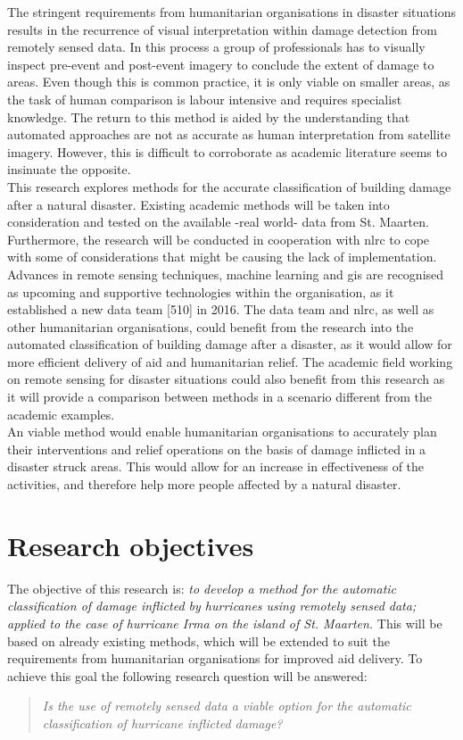 \noindent The stringent requirements from humanitarian organisations in disaster situations results in the recurrence of visual interpretation within damage detection from remotely sensed data. In this process a group of professionals has to visually inspect pre-event and post-event imagery to conclude the extent of damage to areas. Even though this is common practice, it is only viable on smaller areas, as the task of human comparison is labour intensive and requires specialist knowledge. The return to this method is aided by the understanding that automated approaches are not as accurate as human interpretation from satellite imagery. However, this is difficult to corroborate as academic literature seems to insinuate the opposite. \\

\noindent This research explores methods for the accurate classification of building damage after a natural disaster. Existing academic methods will be taken into consideration and tested on the available -real world- data from St. Maarten. Furthermore, the research will be conducted in cooperation with \ac{nlrc} to cope with some of considerations that might be causing the lack of implementation. Advances in remote sensing techniques, machine learning and \ac{gis} are recognised as upcoming and supportive technologies within the organisation, as it established a new data team [510] in 2016. The data team and \ac{nlrc}, as well as other humanitarian organisations, could benefit from the research into the automated classification of building damage after a disaster, as it would allow for more efficient delivery of aid and humanitarian relief. The academic field working on remote sensing for disaster situations could also benefit from this research as it will provide a comparison between methods in a scenario different from the academic examples.\\

\noindent An viable method would enable humanitarian organisations to accurately plan their interventions and relief operations on the basis of damage inflicted in a disaster struck areas. This would allow for an increase in effectiveness of the activities, and therefore help more people affected by a natural disaster.

\section{Research objectives} \label{sec:recobj}
The objective of this research is: \textit{to develop a method for the automatic classification of damage inflicted by hurricanes using remotely sensed data; applied to the case of hurricane Irma on the island of St. Maarten.} This will be based on already existing methods, which will be extended to suit the requirements from humanitarian organisations for improved aid delivery. To achieve this goal the following research question will be answered:
\begin{quote}
	\textit{Is the use of remotely sensed data a viable option for the automatic classification of \mbox{hurricane} inflicted damage?}
\end{quote}


